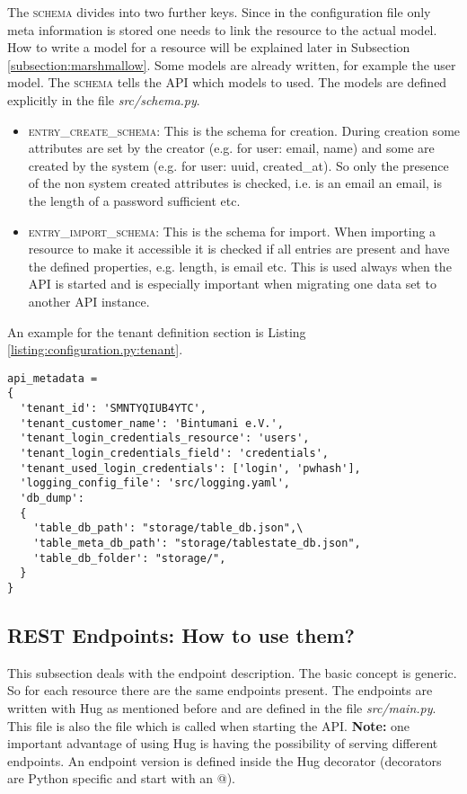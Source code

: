 The \textsc{schema} divides into two further keys. Since in the configuration file only meta information is stored one needs to link the resource to the actual model. How to write a model for a resource will be explained later in Subsection \ref{subsection:marshmallow}. Some models are already written, for example the user model. The  \textsc{schema} tells the API which models to used. The models are defined explicitly in the file \textit{src/schema.py}.
\begin{itemize}
	\item \textsc{entry\_create\_schema}: This is the schema for creation. During creation some attributes are set by the creator (e.g. for user: email, name) and some are created by the system (e.g. for user: uuid, created\_at). So only the presence of the non system created attributes is checked, i.e. is an email an email, is the length of a password sufficient etc.
	\item \textsc{entry\_import\_schema}: This is the schema for import. When importing a resource to make it accessible it is checked if all entries are present and have the defined properties, e.g. length, is email etc. This is used always when the API is started and is especially important when migrating one data set to another API instance.
\end{itemize}
An example for the tenant definition section is Listing \ref{listing:configuration.py:tenant}.
\begin{lstlisting}[caption={Example for a tenant definiton in the \textit{src/configuration.py} file},label={listing:configuration.py:tenant}]
api_metadata = 
{
  'tenant_id': 'SMNTYQIUB4YTC',
  'tenant_customer_name': 'Bintumani e.V.',
  'tenant_login_credentials_resource': 'users',
  'tenant_login_credentials_field': 'credentials', 
  'tenant_used_login_credentials': ['login', 'pwhash'],
  'logging_config_file': 'src/logging.yaml',
  'db_dump': 
  {
    'table_db_path': "storage/table_db.json",\
    'table_meta_db_path': "storage/tablestate_db.json",
    'table_db_folder': "storage/",
  }
}
\end{lstlisting}
\subsection{REST Endpoints: How to use them?}\label{subsection:endpoints}
This subsection deals with the endpoint description. The basic concept is generic. So for each resource there are the same endpoints present. The endpoints are written with Hug as mentioned before and are defined in the file \textit{src/main.py}. This file is also the file which is called when starting the API. \textbf{Note:} one important advantage of using Hug is having the possibility of serving different endpoints. An endpoint version is defined inside the Hug decorator (decorators are Python specific and start with an @). 
